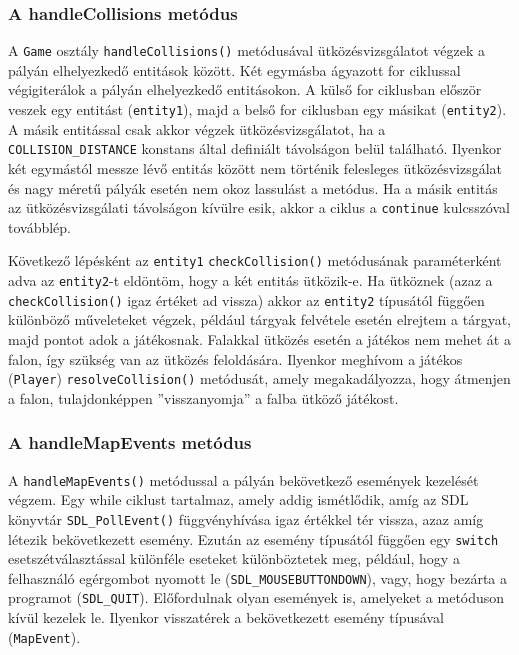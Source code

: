 \subsubsection{A handleCollisions metódus}

A \verb|Game| osztály \verb|handleCollisions()| metódusával ütközésvizsgálatot végzek a pályán elhelyezkedő entitások között. Két egymásba ágyazott for ciklussal végigiterálok a pályán elhelyezkedő entitásokon. A külső for ciklusban először veszek egy entitást (\verb|entity1|), majd a belső for ciklusban egy másikat (\verb|entity2|). A másik entitással csak akkor végzek ütközésvizsgálatot, ha a \verb|COLLISION_DISTANCE| konstans által definiált távolságon belül található. Ilyenkor két egymástól messze lévő entitás között nem történik felesleges ütközésvizsgálat és nagy méretű pályák esetén nem okoz lassulást a metódus. Ha a másik entitás az ütközésvizsgálati távolságon kívülre esik, akkor a ciklus a \verb|continue| kulcsszóval továbblép.

Következő lépésként az \verb|entity1| \verb|checkCollision()| metódusának paraméterként adva az \verb|entity2|-t eldöntöm, hogy a két entitás ütközik-e. Ha ütköznek (azaz a \verb|checkCollision()| igaz értéket ad vissza) akkor az \verb|entity2| típusától függően különböző műveleteket végzek, például tárgyak felvétele esetén elrejtem a tárgyat, majd pontot adok a játékosnak. Falakkal ütközés esetén a játékos nem mehet át a falon, így szükség van az ütközés feloldására. Ilyenkor meghívom a játékos (\verb|Player|) \verb|resolveCollision()| metódusát, amely megakadályozza, hogy átmenjen a falon, tulajdonképpen ''visszanyomja'' a falba ütköző játékost.

\subsubsection{A handleMapEvents metódus}

A \verb|handleMapEvents()| metódussal a pályán bekövetkező események kezelését végzem. Egy while ciklust tartalmaz, amely addig ismétlődik, amíg az SDL könyvtár \verb|SDL_PollEvent()| függvényhívása igaz értékkel tér vissza, azaz amíg létezik bekövetkezett esemény. Ezután az esemény típusától függően egy \verb|switch| esetszétválasztással különféle eseteket különböztetek meg, például, hogy a felhasználó egérgombot nyomott le (\verb|SDL_MOUSEBUTTONDOWN|), vagy, hogy bezárta a programot (\verb|SDL_QUIT|). Előfordulnak olyan események is, amelyeket a metóduson kívül kezelek le. Ilyenkor visszatérek a bekövetkezett esemény típusával (\verb|MapEvent|).

